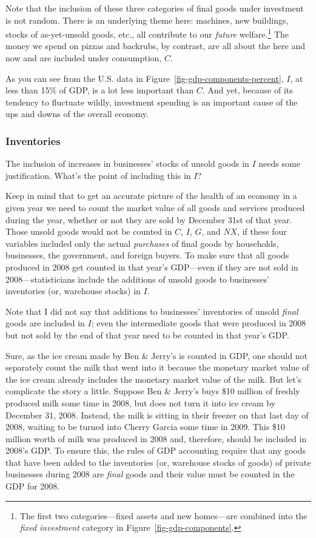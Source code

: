 \documentclass[
  letterpaper,
]{book}
\begin{document}
Note that the inclusion of these three categories of final goods under
investment is not random. There is an underlying theme here: machines,
new buildings, stocks of as-yet-unsold goods, etc., all contribute to
our \emph{future} welfare.\footnote{The first two categories---fixed
  assets and new homes---are combined into the \emph{fixed investment}
  category in Figure~\ref{fig-gdp-components}.} The money we spend on
pizzas and backrubs, by contrast, are all about the here and now and are
included under consumption, \(C\).

As you can see from the U.S. data in
Figure~\ref{fig-gdp-components-percent}, \(I\), at less than 15\% of
GDP, is a lot less important than \(C\). And yet, because of its
tendency to fluctuate wildly, investment spending is an important cause
of the ups and downs of the overall economy.

\subsubsection{Inventories}\label{sec-inventories}


The inclusion of increases in businesses' stocks of unsold goods in
\(I\) needs some justification. What's the point of including this in
\(I\)?

Keep in mind that to get an accurate picture of the health of an economy
in a given year we need to count the market value of all goods and
services produced during the year, whether or not they are sold by
December 31st of that year. Those unsold goods would not be counted in
\(C\), \(I\), \(G\), and \(NX\), if these four variables included only
the actual \emph{purchases} of final goods by households, businesses,
the government, and foreign buyers. To make sure that all goods produced
in 2008 get counted in that year's GDP---even if they are not sold in
2008---statisticians include the additions of unsold goods to
businesses' inventories (or, warehouse stocks) in \(I\).

Note that I did not say that additions to businesses' inventories of
unsold \emph{final} goods are included in \(I\); even the intermediate
goods that were produced in 2008 but not sold by the end of that year
need to be counted in that year's GDP.

Sure, as the ice cream made by Ben \& Jerry's is counted in GDP, one
should not separately count the milk that went into it because the
monetary market value of the ice cream already includes the monetary
market value of the milk. But let's complicate the story a little.
Suppose Ben \& Jerry's buys \$10 million of freshly produced milk some
time in 2008, but does not turn it into ice cream by December 31, 2008.
Instead, the milk is sitting in their freezer on that last day of 2008,
waiting to be turned into Cherry Garcia some time in 2009. This \$10
million worth of milk was produced in 2008 and, therefore, should be
included in 2008's GDP. To ensure this, the rules of GDP accounting
require that any goods that have been added to the inventories (or,
warehouse stocks of goods) of private businesses during 2008 are
\emph{final} goods and their value must be counted in the GDP for 2008.
\end{document}
